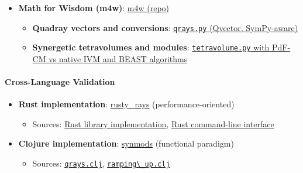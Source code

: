 \documentclass[
  10pt,
]{article}
\newcommand{\passthrough}[1]{#1}
\providecommand{\tightlist}{%
  \setlength{\itemsep}{0pt}\setlength{\parskip}{0pt}}
\begin{document}
\begin{itemize}
\tightlist
\item
  \textbf{Math for Wisdom (m4w)}:
  \href{https://github.com/4dsolutions/m4w}{m4w (repo)}

  \begin{itemize}
  \tightlist
  \item
    \textbf{Quadray vectors and conversions}:
    \href{https://github.com/4dsolutions/m4w/blob/main/qrays.py}{\passthrough{\lstinline!qrays.py!}
    (Qvector, SymPy-aware)}
  \item
    \textbf{Synergetic tetravolumes and modules}:
    \href{https://github.com/4dsolutions/m4w/blob/main/tetravolume.py}{\passthrough{\lstinline!tetravolume.py!}
    with PdF-CM vs native IVM and BEAST algorithms}
  \end{itemize}
\end{itemize}

\hypertarget{cross-language-validation}{%
\paragraph{Cross-Language Validation}\label{cross-language-validation}}

\begin{itemize}
\tightlist
\item
  \textbf{Rust implementation}:
  \href{https://github.com/4dsolutions/rusty_rays}{rusty\_rays}
  (performance-oriented)

  \begin{itemize}
  \tightlist
  \item
    Sources:
    \href{https://github.com/4dsolutions/rusty_rays/blob/master/src/lib.rs}{Rust
    library implementation},
    \href{https://github.com/4dsolutions/rusty_rays/blob/master/src/main.rs}{Rust
    command-line interface}
  \end{itemize}
\item
  \textbf{Clojure implementation}:
  \href{https://github.com/4dsolutions/synmods}{synmods} (functional
  paradigm)

  \begin{itemize}
  \tightlist
  \item
    Sources:
    \href{https://github.com/4dsolutions/synmods/blob/master/qrays.clj}{\passthrough{\lstinline!qrays.clj!}},
    \href{https://github.com/4dsolutions/synmods/blob/master/ramping_up.clj}{\passthrough{\lstinline!ramping\_up.clj!}}
  \end{itemize}
\end{itemize}
\end{document}
